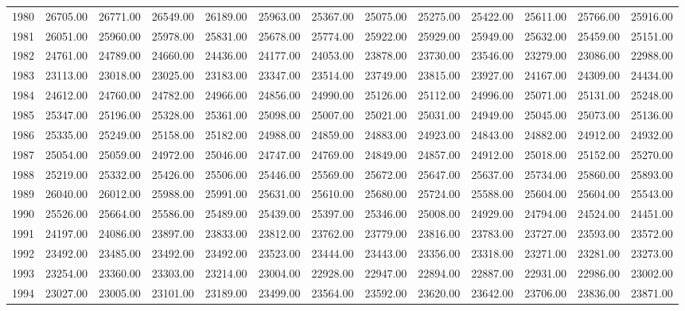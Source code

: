\begin{longtable}{rrrrrrrrrrrrr}
  1980 & 26705.00 & 26771.00 & 26549.00 & 26189.00 & 25963.00 & 25367.00 & 25075.00 & 25275.00 & 25422.00 & 25611.00 & 25766.00 & 25916.00 \\ 
  1981 & 26051.00 & 25960.00 & 25978.00 & 25831.00 & 25678.00 & 25774.00 & 25922.00 & 25929.00 & 25949.00 & 25632.00 & 25459.00 & 25151.00 \\ 
  1982 & 24761.00 & 24789.00 & 24660.00 & 24436.00 & 24177.00 & 24053.00 & 23878.00 & 23730.00 & 23546.00 & 23279.00 & 23086.00 & 22988.00 \\ 
  1983 & 23113.00 & 23018.00 & 23025.00 & 23183.00 & 23347.00 & 23514.00 & 23749.00 & 23815.00 & 23927.00 & 24167.00 & 24309.00 & 24434.00 \\ 
  1984 & 24612.00 & 24760.00 & 24782.00 & 24966.00 & 24856.00 & 24990.00 & 25126.00 & 25112.00 & 24996.00 & 25071.00 & 25131.00 & 25248.00 \\ 
  1985 & 25347.00 & 25196.00 & 25328.00 & 25361.00 & 25098.00 & 25007.00 & 25021.00 & 25031.00 & 24949.00 & 25045.00 & 25073.00 & 25136.00 \\ 
  1986 & 25335.00 & 25249.00 & 25158.00 & 25182.00 & 24988.00 & 24859.00 & 24883.00 & 24923.00 & 24843.00 & 24882.00 & 24912.00 & 24932.00 \\ 
  1987 & 25054.00 & 25059.00 & 24972.00 & 25046.00 & 24747.00 & 24769.00 & 24849.00 & 24857.00 & 24912.00 & 25018.00 & 25152.00 & 25270.00 \\ 
  1988 & 25219.00 & 25332.00 & 25426.00 & 25506.00 & 25446.00 & 25569.00 & 25672.00 & 25647.00 & 25637.00 & 25734.00 & 25860.00 & 25893.00 \\ 
  1989 & 26040.00 & 26012.00 & 25988.00 & 25991.00 & 25631.00 & 25610.00 & 25680.00 & 25724.00 & 25588.00 & 25604.00 & 25604.00 & 25543.00 \\ 
  1990 & 25526.00 & 25664.00 & 25586.00 & 25489.00 & 25439.00 & 25397.00 & 25346.00 & 25008.00 & 24929.00 & 24794.00 & 24524.00 & 24451.00 \\ 
  1991 & 24197.00 & 24086.00 & 23897.00 & 23833.00 & 23812.00 & 23762.00 & 23779.00 & 23816.00 & 23783.00 & 23727.00 & 23593.00 & 23572.00 \\ 
  1992 & 23492.00 & 23485.00 & 23492.00 & 23492.00 & 23523.00 & 23444.00 & 23443.00 & 23356.00 & 23318.00 & 23271.00 & 23281.00 & 23273.00 \\ 
  1993 & 23254.00 & 23360.00 & 23303.00 & 23214.00 & 23004.00 & 22928.00 & 22947.00 & 22894.00 & 22887.00 & 22931.00 & 22986.00 & 23002.00 \\ 
  1994 & 23027.00 & 23005.00 & 23101.00 & 23189.00 & 23499.00 & 23564.00 & 23592.00 & 23620.00 & 23642.00 & 23706.00 & 23836.00 & 23871.00 \\ 

\end{longtable}
